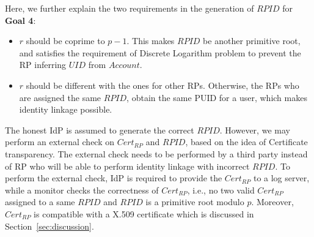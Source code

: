 Here, we further explain the two requirements in the generation of $RPID$ for \textbf{Goal 4}:
\begin{itemize}
  \item $r$ should be coprime to $p-1$. This makes $RPID$ be another primitive root, and satisfies the requirement of Discrete Logarithm problem to prevent the RP inferring $UID$ from $Account$.
  \item $r$ should be different with the ones for other RPs. Otherwise, the RPs who are assigned the same $RPID$, obtain the same PUID for a user, which makes identity linkage possible.
\end{itemize}

The honest IdP is assumed to generate the correct $RPID$. However, we may perform an external check on $Cert_{RP}$ and $RPID$, based on the idea of Certificate transparency. The external check needs to be performed by a third party instead of RP who will be able to perform identity linkage with incorrect $RPID$. To perform the external check, IdP is required to provide the $Cert_{RP}$ to a log server, while a monitor checks the correctness of $Cert_{RP}$, i.e., no two valid $Cert_{RP}$ assigned to a same $RPID$ and $RPID$ is a primitive root modulo $p$. Moreover, $Cert_{RP}$ is compatible with a X.509 certificate which is discussed in Section~\ref{sec:discussion}.




